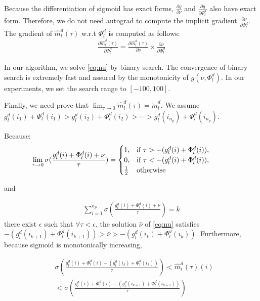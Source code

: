 \documentclass[11pt]{article}
\begin{document}
Because the differentiation of sigmoid has exact forms, $\frac{\partial g}{\partial \nu}$ and $\frac{\partial g}{\partial \Phi_l^d}$ also have exact form. Therefore, we do not need autograd to compute the implicit gradient $\frac{\partial \nu}{\partial \Phi_l^d}$. The gradient of $\hat{m}_l^d(\tau)$ w.r.t $\Phi_l^d$ is computed as follows:
\begin{align}
\frac{\partial \hat{m}_l^d(\tau)}{\partial \Phi_l^d} = \frac{\partial \hat{m}_l^d(\tau)}{\partial \nu} \times \frac{\partial \nu}{\partial \Phi_l^d}
\end{align}

In our algorithm, we solve \eqref{eq:nu} by binary search. The convergence of binary search is extremely fast and assured by the monotonicity of $g(\nu,\Phi_l^d)$. In our experiments, we set the search range to $[-100,100]$.

Finally, we need prove that $\lim_{\tau \rightarrow 0}\hat{m}_l^d(\tau) = \tilde{m}_l^d$. We assume $g_l^d(i_1) + \Phi_l^d(i_1) > g_l^d(i_2) + \Phi_l^d(i_2) > \cdots > g_l^d(i_{n_p}) + \Phi_l^d(i_{n_p})$.

Because:
\begin{align*}
\hspace{-3.em}
\lim_{\tau \rightarrow 0} \sigma(\frac{g_l^d(i) + \Phi_l^d(i) + \nu}{\tau}) = \begin{cases}
      1, & \text{if}\ \tau > - (g_l^d(i) + \Phi_l^d(i)), \\
      0, & \text{if}\ \tau < - (g_l^d(i) + \Phi_l^d(i)), \\
      \frac{1}{2} &\text{otherwise}\\
    \end{cases}
\end{align*}

and 

\begin{align*}
\displaystyle{\mathop{\sum}_{i=1}^{n_p}} \sigma(\frac{g_l^d(i) + \Phi_l^d(i) + \nu}{\tau}) = k
\end{align*}
there exist $\epsilon$ such that $\forall \tau < \epsilon$, the solution $\bar{\nu}$ of \eqref{eq:nu} satisfies $- (g_l^d(i_{k+1}) + \Phi_l^d(i_{k+1})) > \bar{\nu} > - (g_l^d(i_k) + \Phi_l^d(i_k))$. Furthermore, because sigmoid is monotonically increasing,

\begin{align*}
&\sigma(\frac{g_l^d(i) + \Phi_l^d(i) - (g_l^d(i_{k}) + \Phi_l^d(i_{k}))}{\tau}) < \hat{m}_l^d(\tau)(i)  \\
& < \sigma(\frac{g_l^d(i) + \Phi_l^d(i) - (g_l^d(i_{k+1}) + \Phi_l^d(i_{k+1}))}{\tau}) 
\end{align*}
\end{document}
